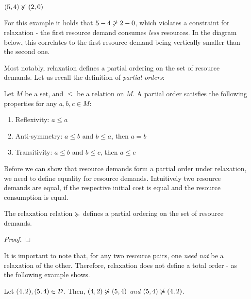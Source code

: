 \begin{example}
   \((5, 4) \notrelaxation (2, 0)\)

For this example it holds that \(5 - 4 \centernot{\geq} 2 - 0\), which violates a constraint for relaxation - the first resource demand consumes \emph{less} resources. In the diagram below, this correlates to the first resource demand being vertically smaller than the second one.


\end{example}

Most notably, relaxation defines a partial ordering on the set of resource demands. Let us recall the definition of \emph{partial orders}:

\begin{definition}
   Let \(M\) be a set, and \(\leq\) be a relation on \(M\). A partial order satisfies the following properties for any \(a, b, c \in M\):
   \begin{enumerate}[label=\Roman*]
      \item Reflexivity: \(a \leq a \) 
      \item Anti-symmetry: \(a \leq b\) and \(b \leq a\), then \(a = b\) 
      \item Transitivity: \(a \leq b\) and \(b \leq c\), then \(a \leq c\)
   \end{enumerate}
\end{definition}

Before we can show that resource demands form a partial order under relaxation, we need to define equality for resource demands. Intuitively two resource demands are equal, if the respective initial cost is equal and the resource consumption is equal. 

\begin{lemma}
   The relaxation relation \(\succcurlyeq\) defines a partial ordering on the set of resource demands.
\end{lemma}

\begin{proof}
\end{proof}

It is important to note that, for any two resource pairs, one \emph{need not} be a relaxation of the other. Therefore, relaxation does not define a total order - as the following example shows.

\begin{example}
   Let \((4,2), (5,4) \in \mathcal{D}\). Then, \((4,2) \notrelaxation (5,4)\) \emph{and} \((5,4) \notrelaxation (4,2)\).
\end{example}


